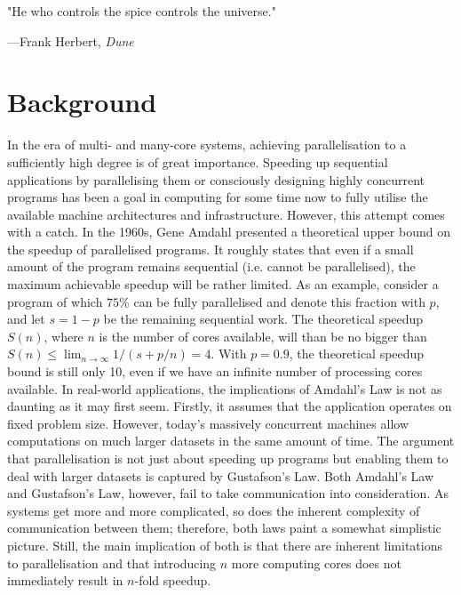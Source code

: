 \epigraph{"He who controls the spice controls the universe."}{---Frank Herbert, \textit{Dune}}

\section{Background}
In the era of multi- and many-core systems, achieving parallelisation to a sufficiently high degree is of great importance. Speeding up sequential applications by parallelising them or consciously designing highly concurrent programs has been a goal in computing for some time now to fully utilise the available machine architectures and infrastructure. However, this attempt comes with a catch. In the 1960s, Gene Amdahl presented a theoretical upper bound\cite{amdahl} on the speedup of parallelised programs. It roughly states that even if a small amount of the program remains sequential (i.e. cannot be parallelised), the maximum achievable speedup will be rather limited. As an example, consider a program of which $75\%$ can be fully parallelised and denote this fraction with $p$, and let $s = 1 - p$ be the remaining sequential work. The theoretical speedup $S(n)$, where $n$ is the number of cores available, will than be no bigger than $S(n) \leq \lim_{n \to \infty} 1/(s + p/n) = 4$. With $p = 0.9$, the theoretical speedup bound is still only 10, even if we have an infinite number of processing cores available. In real-world applications, the implications of Amdahl's Law is not as daunting as it may first seem. Firstly, it assumes that the application operates on fixed problem size. However, today's massively concurrent machines allow computations on much larger datasets in the same amount of time. The argument that parallelisation is not just about speeding up programs but enabling them to deal with larger datasets is captured by Gustafson's Law\cite{gustafson}. Both Amdahl's Law and Gustafson's Law, however, fail to take communication into consideration. As systems get more and more complicated, so does the inherent complexity of communication between them; therefore, both laws paint a somewhat simplistic picture. Still, the main implication of both is that there are inherent limitations to parallelisation and that introducing $n$ more computing cores does not immediately result in $n$-fold speedup.

